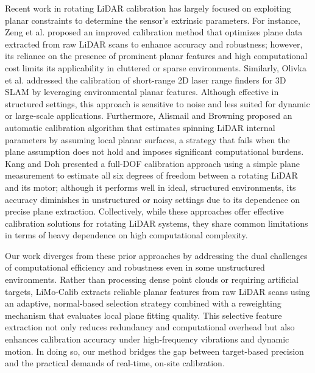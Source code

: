 Recent work in rotating LiDAR calibration has largely focused on exploiting planar constraints to determine the sensor’s extrinsic parameters. For instance, Zeng et al. \cite{zeng2018} proposed an improved calibration method that optimizes plane data extracted from raw LiDAR scans to enhance accuracy and robustness; however, its reliance on the presence of prominent planar features and high computational cost limits its applicability in cluttered or sparse environments. Similarly, Olivka et al. \cite{olivka2016} addressed the calibration of short-range 2D laser range finders for 3D SLAM by leveraging environmental planar features. Although effective in structured settings, this approach is sensitive to noise and less suited for dynamic or large-scale applications. Furthermore, Alismail and Browning \cite{alismail2015automatic} proposed an automatic calibration algorithm that estimates spinning LiDAR internal parameters by assuming local planar surfaces, a strategy that fails when the plane assumption does not hold and imposes significant computational burdens. Kang and Doh \cite{kang2016full} presented a full-DOF calibration approach using a simple plane measurement to estimate all six degrees of freedom between a rotating LiDAR and its motor; although it performs well in ideal, structured environments, its accuracy diminishes in unstructured or noisy settings due to its dependence on precise plane extraction. Collectively, while these approaches offer effective calibration solutions for rotating LiDAR systems, they share common limitations in terms of heavy dependence on high computational complexity.

Our work diverges from these prior approaches by addressing the dual challenges of computational efficiency and robustness even in some unstructured environments. Rather than processing dense point clouds or requiring artificial targets, LiMo-Calib extracts reliable planar features from raw LiDAR scans using an adaptive, normal-based selection strategy combined with a reweighting mechanism that evaluates local plane fitting quality. This selective feature extraction not only reduces redundancy and computational overhead but also enhances calibration accuracy under high-frequency vibrations and dynamic motion. In doing so, our method bridges the gap between target-based precision and the practical demands of real-time, on-site calibration.